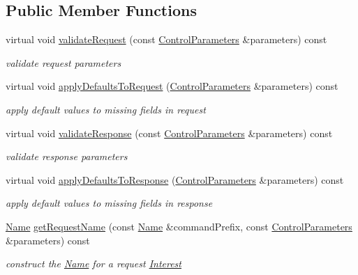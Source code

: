 \subsection*{Public Member Functions}
\begin{DoxyCompactItemize}
\item 
virtual void \hyperlink{classndn_1_1nfd_1_1ControlCommand_a7efcc3711d39f3711ddbffb2c71e751b}{validate\+Request} (const \hyperlink{classndn_1_1nfd_1_1ControlParameters}{Control\+Parameters} \&parameters) const
\begin{DoxyCompactList}\small\item\em validate request parameters \end{DoxyCompactList}\item 
virtual void \hyperlink{classndn_1_1nfd_1_1ControlCommand_a6baa3e092320f93cb09df2ed7464baf8}{apply\+Defaults\+To\+Request} (\hyperlink{classndn_1_1nfd_1_1ControlParameters}{Control\+Parameters} \&parameters) const\hypertarget{classndn_1_1nfd_1_1ControlCommand_a6baa3e092320f93cb09df2ed7464baf8}{}\label{classndn_1_1nfd_1_1ControlCommand_a6baa3e092320f93cb09df2ed7464baf8}

\begin{DoxyCompactList}\small\item\em apply default values to missing fields in request \end{DoxyCompactList}\item 
virtual void \hyperlink{classndn_1_1nfd_1_1ControlCommand_a479414f06f65e7ad819c94e365fa0981}{validate\+Response} (const \hyperlink{classndn_1_1nfd_1_1ControlParameters}{Control\+Parameters} \&parameters) const
\begin{DoxyCompactList}\small\item\em validate response parameters \end{DoxyCompactList}\item 
virtual void \hyperlink{classndn_1_1nfd_1_1ControlCommand_a85f0c6e0e4318fe9ed9e372346dc4a7a}{apply\+Defaults\+To\+Response} (\hyperlink{classndn_1_1nfd_1_1ControlParameters}{Control\+Parameters} \&parameters) const\hypertarget{classndn_1_1nfd_1_1ControlCommand_a85f0c6e0e4318fe9ed9e372346dc4a7a}{}\label{classndn_1_1nfd_1_1ControlCommand_a85f0c6e0e4318fe9ed9e372346dc4a7a}

\begin{DoxyCompactList}\small\item\em apply default values to missing fields in response \end{DoxyCompactList}\item 
\hyperlink{classndn_1_1Name}{Name} \hyperlink{classndn_1_1nfd_1_1ControlCommand_a15e3d7d929f606def9762481a3ce36ec}{get\+Request\+Name} (const \hyperlink{classndn_1_1Name}{Name} \&command\+Prefix, const \hyperlink{classndn_1_1nfd_1_1ControlParameters}{Control\+Parameters} \&parameters) const
\begin{DoxyCompactList}\small\item\em construct the \hyperlink{classndn_1_1Name}{Name} for a request \hyperlink{classndn_1_1Interest}{Interest} \end{DoxyCompactList}\end{DoxyCompactItemize}
